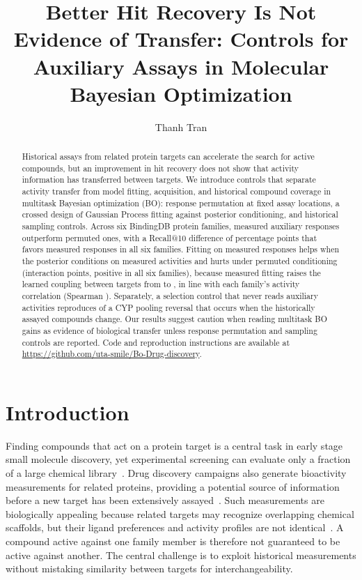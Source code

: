 \documentclass[10pt,letterpaper,runningheads]{llncs}
\title{Better Hit Recovery Is Not Evidence of Transfer: Controls for Auxiliary Assays in Molecular Bayesian Optimization}
\author{Thanh Tran\orcidID{0009-0008-8775-074X}}
\institute{
University of Texas at Arlington,
Arlington, TX, USA\\
\email{cxt5391@mavs.uta.edu}
}
\begin{document}
\maketitle


\begin{abstract}
Historical assays from related protein targets can accelerate the search
for active compounds, but an improvement in hit recovery does not show
that activity information has transferred between targets. We introduce
controls that separate activity transfer from model fitting, acquisition,
and historical compound coverage in multitask Bayesian optimization (BO):
response permutation at fixed assay locations, a crossed design of
Gaussian Process fitting against posterior conditioning, and historical
sampling controls. Across six BindingDB protein families, measured
auxiliary responses outperform permuted ones, with a Recall@10 difference
of \crossPrimary{} percentage points that favors measured responses in
all six families. Fitting on measured responses helps when the posterior
conditions on measured activities and hurts under permuted conditioning
(interaction \crossInteraction{} points, positive in all six families),
because measured fitting raises the learned coupling between targets
from \couplingPermuted{} to \couplingMeasured{}, in line with each
family's activity correlation (Spearman \couplingVsCorr{}). Separately,
a selection control that never reads auxiliary activities reproduces
\avoidRecallFracHundred{} of a CYP pooling reversal that occurs when the
historically assayed compounds change. Our results suggest caution when
reading multitask BO gains as evidence of biological transfer unless
response permutation and sampling controls are reported.
Code and reproduction instructions are available at
\url{https://github.com/uta-smile/Bo-Drug-discovery}.
\end{abstract}


\clearpage
\label{page:main-start}


\section{Introduction}
\label{sec:intro}

Finding compounds that act on a protein target is a central task in early stage small molecule discovery, yet experimental screening can evaluate only a fraction of a large chemical library~\cite{reker2015active}. Drug discovery campaigns also generate bioactivity measurements for related proteins, providing a potential source of information before a new target has been extensively assayed~\cite{paolini2006global}. Such measurements are biologically appealing because related targets may recognize overlapping chemical scaffolds, but their ligand preferences and activity profiles are not identical~\cite{keiser2007relating,davis2011comprehensive}. A compound active against one family member is therefore not guaranteed to be active against another. The central challenge is to exploit historical measurements without mistaking similarity between targets for interchangeability.
\end{document}
